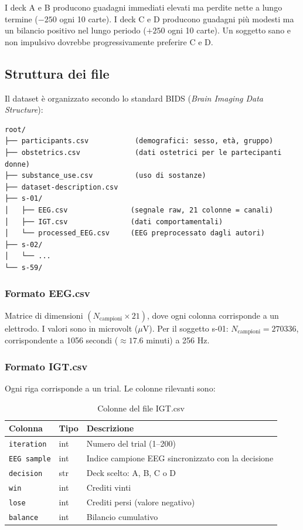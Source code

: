 \documentclass[12pt, a4paper]{article}
\begin{document}
I deck A e B producono guadagni immediati elevati ma perdite nette a lungo termine ($-250$ ogni 10 carte). I deck C e D producono guadagni più modesti ma un bilancio positivo nel lungo periodo ($+250$ ogni 10 carte). Un soggetto sano e non impulsivo dovrebbe progressivamente preferire C e D.

\subsection{Struttura dei file}

Il dataset è organizzato secondo lo standard BIDS (\textit{Brain Imaging Data Structure}):

\begin{verbatim}
root/
├── participants.csv           (demografici: sesso, età, gruppo)
├── obstetrics.csv             (dati ostetrici per le partecipanti donne)
├── substance_use.csv          (uso di sostanze)
├── dataset-description.csv
├── s-01/
│   ├── EEG.csv               (segnale raw, 21 colonne = canali)
│   ├── IGT.csv               (dati comportamentali)
│   └── processed_EEG.csv     (EEG preprocessato dagli autori)
├── s-02/
│   └── ...
└── s-59/
\end{verbatim}

\subsubsection{Formato EEG.csv}
Matrice di dimensioni $(N_\text{campioni} \times 21)$, dove ogni colonna corrisponde a un elettrodo. I valori sono in microvolt ($\mu$V). Per il soggetto s-01: $N_\text{campioni} = 270336$, corrispondente a 1056 secondi ($\approx 17.6$ minuti) a 256 Hz.

\subsubsection{Formato IGT.csv}
Ogni riga corrisponde a un trial. Le colonne rilevanti sono:

\begin{table}[h!]
\centering
\caption{Colonne del file IGT.csv}
\begin{tabular}{lll}
\toprule
\textbf{Colonna} & \textbf{Tipo} & \textbf{Descrizione} \\
\midrule
\texttt{iteration} & int & Numero del trial (1--200) \\
\texttt{EEG sample} & int & Indice campione EEG sincronizzato con la decisione \\
\texttt{decision} & str & Deck scelto: A, B, C o D \\
\texttt{win} & int & Crediti vinti \\
\texttt{lose} & int & Crediti persi (valore negativo) \\
\texttt{balance} & int & Bilancio cumulativo \\
\bottomrule
\end{tabular}
\end{table}
\end{document}
